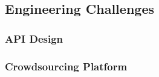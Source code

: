 \subsection{Engineering Challenges}
\subsubsection{API Design}

\subsubsection{Crowdsourcing Platform}
